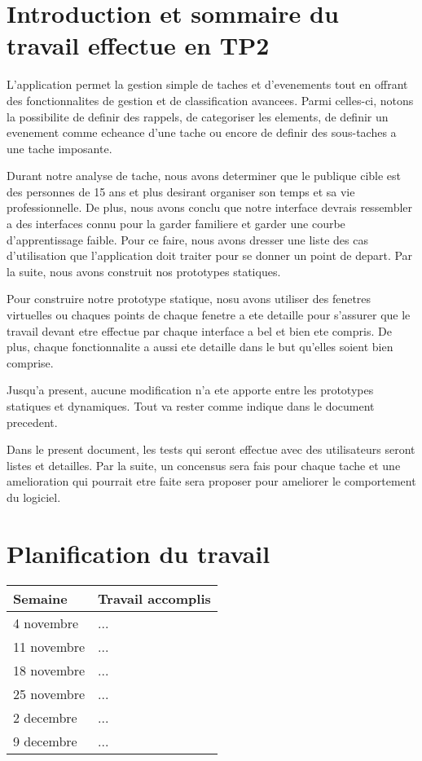 \documentclass[letterpaper, oneside, 12pt, these, creativecommons]{thETS}
\begin{document}
\tableofcontents
\listoftables
\listoffigures

\chapter{Introduction et sommaire du travail effectue en TP2}

L'application permet la gestion simple de taches et d'evenements tout en offrant des fonctionnalites de gestion et de classification avancees. Parmi celles-ci, notons la possibilite de definir des rappels, de categoriser les elements, de definir un evenement comme echeance d'une tache ou encore de definir des sous-taches a une tache imposante.

Durant notre analyse de tache, nous avons determiner que le publique cible est des personnes de 15 ans et plus desirant organiser son temps et sa vie professionnelle. De plus, nous avons conclu que notre interface devrais ressembler a des interfaces connu pour la garder familiere et garder une courbe d'apprentissage faible. Pour ce faire, nous avons dresser une liste des cas d'utilisation que l'application doit traiter pour se donner un point de depart. Par la suite, nous avons construit nos prototypes statiques.

Pour construire notre prototype statique, nosu avons utiliser des fenetres virtuelles ou chaques points de chaque fenetre a ete detaille pour s'assurer que le travail devant etre effectue par chaque interface a bel et bien ete compris. De plus, chaque fonctionnalite a aussi ete detaille dans le but qu'elles soient bien comprise.

Jusqu'a present, aucune modification n'a ete apporte entre les prototypes statiques et dynamiques. Tout va rester comme indique dans le document precedent.

Dans le present document, les tests qui seront effectue avec des utilisateurs seront listes et detailles. Par la suite, un concensus sera fais pour chaque tache et une amelioration qui pourrait etre faite sera proposer pour ameliorer le comportement du logiciel.

\chapter{Planification du travail}

\begin{table}
	\centering
	\begin{tabular}{|l|l|}
		\hline
		Semaine		& Travail accomplis 	\\ \hline
		4 novembre	& ... 			\\ \hline
		11 novembre	& ... 			\\ \hline
		18 novembre	& ... 			\\ \hline
		25 novembre	& ... 			\\ \hline
		2 decembre	& ... 			\\ \hline
		9 decembre	& ... 			\\ \hline
	\end{tabular}
\end{table}
\end{document}

